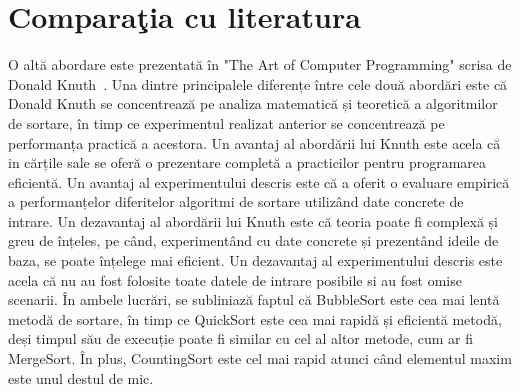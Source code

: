 \documentclass[12pt]{article}
\begin{document}
\section{Comparaţia cu literatura}



O altă abordare este prezentată în "The Art of Computer Programming" scrisa de  Donald Knuth~\cite{donald1999art}. Una dintre principalele diferențe între cele două abordări este că Donald Knuth se concentrează pe analiza matematică și teoretică a algoritmilor de sortare, în timp ce experimentul realizat anterior se concentrează pe performanța practică a acestora. Un avantaj al abordării lui Knuth este acela că in cărțile sale se oferă o prezentare completă a practicilor pentru programarea eficientă. Un avantaj al experimentului descris este că a oferit o evaluare empirică a performanțelor diferitelor algoritmi de sortare utilizând date concrete de intrare. Un dezavantaj al abordării lui Knuth este că teoria poate fi complexă și greu de înțeles, pe când, experimentând cu date concrete și prezentând ideile de baza, se poate înțelege mai eficient. Un dezavantaj al experimentului descris este acela că nu au fost folosite toate datele de intrare posibile si au fost omise scenarii.  În ambele lucrări, se subliniază faptul că BubbleSort este cea mai lentă metodă de sortare, în timp ce QuickSort este cea mai rapidă și eficientă metodă, deși timpul său de execuție poate fi similar cu cel al altor metode, cum ar fi MergeSort. În plus, CountingSort este cel mai rapid atunci când elementul maxim este unul destul de mic.
\end{document}
